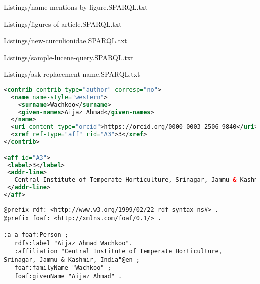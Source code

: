 
{Listings/name-mentions-by-figure.SPARQL.txt}


{Listings/figures-of-article.SPARQL.txt}


{Listings/new-curculionidae.SPARQL.txt}


{ Listings/sample-lucene-query.SPARQL.txt}


{Listings/ask-replacement-name.SPARQL.txt}





\begin{lstlisting}[language=XML,
caption=XML snippet of an author.,
label=listing:author-xml-snippet, basicstyle=\ttfamily\scriptsize]
<contrib contrib-type="author" corresp="no">
  <name name-style="western">
    <surname>Wachkoo</surname>
    <given-names>Aijaz Ahmad</given-names>
  </name>
  <uri content-type="orcid">https://orcid.org/0000-0003-2506-9840</uri>
  <xref ref-type="aff" rid="A3">3</xref>
</contrib>  

<aff id="A3">
 <label>3</label>
 <addr-line>
   Central Institute of Temperate Horticulture, Srinagar, Jammu & Kashmir, India
 </addr-line>
</aff>
\end{lstlisting}

\begin{lstlisting}[language=SPARQL,
caption=RDF snippet of an author. This is a somewhat idealized situation in which the language of the address was available from the article., label=listing:author_rdf, basicstyle=\ttfamily\scriptsize]
@prefix rdf: <http://www.w3.org/1999/02/22-rdf-syntax-ns#> .
@prefix foaf: <http://xmlns.com/foaf/0.1/> .

:a a foaf:Person ;
   rdfs:label "Aijaz Ahmad Wachkoo".
   :affiliation "Central Institute of Temperate Horticulture, Srinagar, Jammu & Kashmir, India"@en ;
   foaf:familyName "Wachkoo" ;
   foaf:givenName "Aijaz Ahmad" .
\end{lstlisting}

